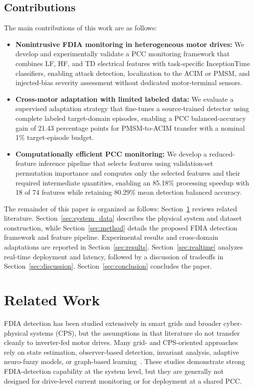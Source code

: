 \documentclass[letterpaper,journal]{IEEEtran}
\begin{document}
\subsection{Contributions}
\label{sec:contributions}
The main contributions of this work are as follows:

\begin{itemize}
\item \textbf{Nonintrusive FDIA monitoring in heterogeneous motor drives:} We develop and experimentally validate a PCC monitoring framework that combines LF, HF, and TD electrical features with task-specific InceptionTime classifiers, enabling attack detection, localization to the ACIM or PMSM, and injected-bias severity assessment without dedicated motor-terminal sensors.
\item \textbf{Cross-motor adaptation with limited labeled data:} We evaluate a supervised adaptation strategy that fine-tunes a source-trained detector using complete labeled target-domain episodes, enabling a PCC balanced-accuracy gain of 21.43 percentage points for PMSM-to-ACIM transfer with a nominal 1\% target-episode budget.
\item \textbf{Computationally efficient PCC monitoring:} We develop a reduced-feature inference pipeline that selects features using validation-set permutation importance and computes only the selected features and their required intermediate quantities, enabling an 85.18\% processing speedup with 18 of 74 features while retaining 80.29\% mean detection balanced accuracy.
\end{itemize}

The remainder of this paper is organized as follows: Section~\ref{sec:relatedWorks} reviews related literature. Section~\ref{sec:system_data} describes the physical system and dataset construction, while Section~\ref{sec:method} details the proposed FDIA detection framework and feature pipeline. Experimental results and cross-domain adaptations are reported in Section~\ref{sec:results}. Section~\ref{sec:realtime} analyzes real-time deployment and latency, followed by a discussion of tradeoffs in Section~\ref{sec:discussion}. Section~\ref{sec:conclusion} concludes the paper.

\section{Related Work}
\label{sec:relatedWorks}

FDIA detection has been studied extensively in smart grids and broader cyber-physical systems (CPS), but the assumptions in that literature do not transfer cleanly to inverter-fed motor drives. Many grid- and CPS-oriented approaches rely on state estimation, observer-based detection, invariant analysis, adaptive neuro-fuzzy models, or graph-based learning~\cite{7438916,basati2022fdi,nath2022quickest,beg2017fdia,sargolzaei2020fdia,10016905}. These studies demonstrate strong FDIA-detection capability at the system level, but they are generally not designed for drive-level current monitoring or for deployment at a shared PCC.
\end{document}
